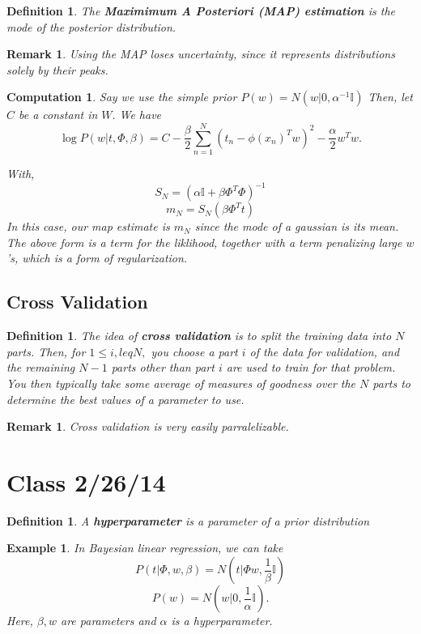 \documentclass{amsart}
\newtheorem{comp}[subsubsection]{Computation}
\newtheorem{defn}[subsubsection]{Definition}
\newtheorem{rem}[subsubsection]{Remark}
\newtheorem{eg}[subsection]{Example}
\begin{document}
\begin{defn}
The {\bf Maximimum A Posteriori (MAP) estimation} is the mode of the posterior distribution.
\end{defn}

\begin{rem}
Using the MAP loses uncertainty, since it represents distributions solely by their peaks.
\end{rem}

\begin{comp}
Say we use the simple prior $P(w) = N(w|0,\alpha^{-1} \mathbb I)$
Then, let $C$ be a constant in $W.$ We have
$$\log P(w|t,\Phi,\beta) = C - \frac \beta 2 \sum_{n=1}^N (t_n - \phi(x_n)^T w)^2 - \frac \alpha 2 w^T w.$$

With,
$$S_N = \left( \alpha \mathbb I + \beta \Phi^T\Phi\right)^{-1}$$
$$m_N = S_N (\beta \Phi^T t)$$
In this case, our map estimate is $m_N$ since the mode of a gaussian is its mean. The above form is a term for the liklihood, together with a term penalizing large $w$'s, which is a form of regularization.
\end{comp}

\subsection{Cross Validation}
\begin{defn}
The idea of {\bf cross validation} is to split the training data into $N$ parts. Then, for $1 \leq i, leq N,$ you choose a  part $i$ of the data for validation, and the remaining $N-1$ parts other than part $i$ are used to train for that problem. You then typically take some average of measures of goodness over the $N$ parts to determine the best values of a parameter to use.
\end{defn}

\begin{rem}
Cross validation is very easily parralelizable.
\end{rem}

\section{Class 2/26/14}

\begin{defn}
A {\bf hyperparameter} is a parameter of a prior distribution
\end{defn}

\begin{eg}
In Bayesian linear regression, we can take
$$P(t|\Phi,w,\beta) = N(t|\Phi w, \frac 1 \beta \mathbb I)$$
$$P(w) = N(w|0,\frac 1 \alpha \mathbb I).$$
Here, $\beta, w$ are parameters and $\alpha$ is a hyperparameter.
\end{eg}
\end{document}
